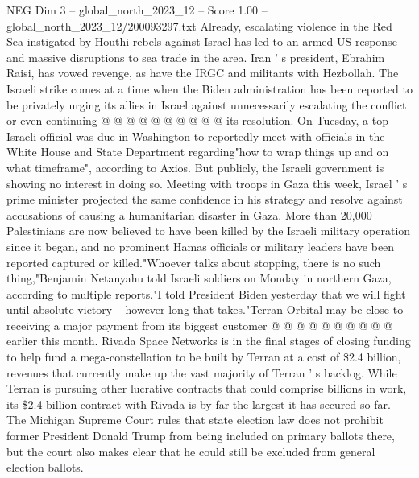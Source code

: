 \begin{textsample}{NEG Dim 3 – global\_north\_2023\_12 – Score 1.00 – global\_north\_2023\_12/200093297.txt}
Already, escalating violence in the Red Sea instigated by Houthi rebels against Israel has led to an armed US response and massive disruptions to sea trade in the area.
Iran ' s president, Ebrahim Raisi, has vowed revenge, as have the IRGC and militants with Hezbollah.
The Israeli strike comes at a time when the Biden administration has been reported to be privately urging its allies in Israel against unnecessarily escalating the conflict or even continuing @ @ @ @ @ @ @ @ @ @ its resolution.
On Tuesday, a top Israeli official was due in Washington to reportedly meet with officials in the White House and State Department regarding"how to wrap things up and on what timeframe", according to Axios.
But publicly, the Israeli government is showing no interest in doing so.
Meeting with troops in Gaza this week, Israel ' s prime minister projected the same confidence in his strategy and resolve against accusations of causing a humanitarian disaster in Gaza.
More than 20,000 Palestinians are now believed to have been killed by the Israeli military operation since it began, and no prominent Hamas officials or military leaders have been reported captured or killed."Whoever talks about stopping, there is no such thing,"Benjamin Netanyahu told Israeli soldiers on Monday in northern Gaza, according to multiple reports."I told President Biden yesterday that we will fight until absolute victory -- however long that takes."Terran Orbital may be close to receiving a major payment from its biggest customer @ @ @ @ @ @ @ @ @ @ earlier this month.
Rivada Space Networks is in the final stages of closing funding to help fund a mega-constellation to be built by Terran at a cost of \$2.4 billion, revenues that currently make up the vast majority of Terran ' s backlog.
While Terran is pursuing other lucrative contracts that could comprise billions in work, its \$2.4 billion contract with Rivada is by far the largest it has secured so far.
The Michigan Supreme Court rules that state election law does not prohibit former President Donald Trump from being included on primary ballots there, but the court also makes clear that he could still be excluded from general election ballots.

\end{textsample}
